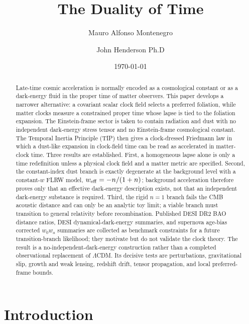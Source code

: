 \documentclass[aps,prd,reprint,nofootinbib,superscriptaddress,longbibliography]{revtex4-2}
\newcommand{\LCDM}{$\Lambda$CDM}
\begin{document}
\title{The Duality of Time}

\author{Mauro Alfonso Montenegro}
\author{John Henderson Ph.D}
\affiliation{}


\date{\today}

\begin{abstract}
Late-time cosmic acceleration is normally encoded as a cosmological constant or as a dark-energy fluid in the proper time of matter observers.  This paper develops a narrower alternative: a covariant scalar clock field selects a preferred foliation, while matter clocks measure a constrained proper time whose lapse is tied to the foliation expansion.  The Einstein-frame sector is taken to contain radiation and dust with no independent dark-energy stress tensor and no Einstein-frame cosmological constant.  The Temporal Inertia Principle (TIP) then gives a clock-dressed Friedmann law in which a dust-like expansion in clock-field time can be read as accelerated in matter-clock time.  Three results are established.  First, a homogeneous lapse alone is only a time redefinition unless a physical clock field and a matter metric are specified.  Second, the constant-index dust branch is exactly degenerate at the background level with a constant-$w$ FLRW model, $w_{\rm eff}=-n/(1+n)$; background acceleration therefore proves only that an effective dark-energy description exists, not that an independent dark-energy substance is required.  Third, the rigid $n=1$ branch fails the CMB acoustic distance and can only be an analytic toy limit; a viable branch must transition to general relativity before recombination.  Published DESI DR2 BAO distance ratios, DESI dynamical-dark-energy summaries, and supernova age-bias corrected $w_0w_a$ summaries are collected as benchmark constraints for a future transition-branch likelihood; they motivate but do not validate the clock theory.  The result is a no-independent-dark-energy construction rather than a completed observational replacement of \LCDM.  Its decisive tests are perturbations, gravitational slip, growth and weak lensing, redshift drift, tensor propagation, and local preferred-frame bounds. 
\end{abstract}

\maketitle

\section{Introduction}
\end{document}

